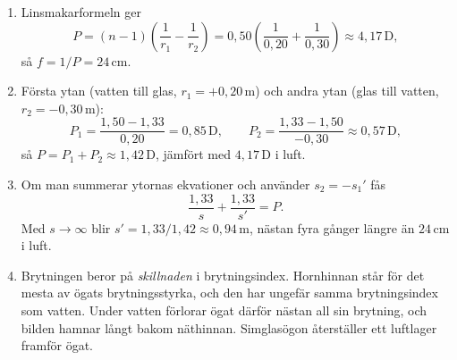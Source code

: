 \begin{enumerate}
  \item Linsmakarformeln ger
  \[
    P = (n - 1)\left(\frac{1}{r_1} - \frac{1}{r_2}\right) = 0{,}50\left(\frac{1}{0{,}20} + \frac{1}{0{,}30}\right) \approx 4{,}17\,\mathrm{D},
  \]
  så $f = 1/P = 24\,\mathrm{cm}$.
  \item Första ytan (vatten till glas, $r_1 = +0{,}20\,\mathrm{m}$) och andra ytan (glas till vatten, $r_2 = -0{,}30\,\mathrm{m}$):
  \[
    P_1 = \frac{1{,}50 - 1{,}33}{0{,}20} = 0{,}85\,\mathrm{D}, \qquad P_2 = \frac{1{,}33 - 1{,}50}{-0{,}30} \approx 0{,}57\,\mathrm{D},
  \]
  så $P = P_1 + P_2 \approx 1{,}42\,\mathrm{D}$, jämfört med $4{,}17\,\mathrm{D}$ i luft.
  \item Om man summerar ytornas ekvationer och använder $s_2 = -s_1'$ fås
  \[
    \frac{1{,}33}{s} + \frac{1{,}33}{s'} = P.
  \]
  Med $s \to \infty$ blir $s' = 1{,}33/1{,}42 \approx 0{,}94\,\mathrm{m}$, nästan fyra gånger längre än $24\,\mathrm{cm}$ i luft.
  \item Brytningen beror på \emph{skillnaden} i brytningsindex. Hornhinnan står för det mesta av ögats brytningsstyrka, och den har ungefär samma brytningsindex som vatten. Under vatten förlorar ögat därför nästan all sin brytning, och bilden hamnar långt bakom näthinnan. Simglasögon återställer ett luftlager framför ögat.
\end{enumerate}
